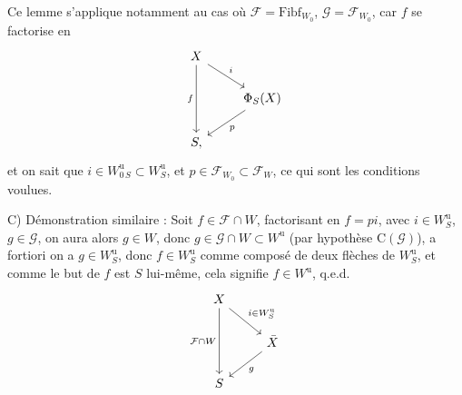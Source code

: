 \documentclass[11pt]{article}
\newcommand{\msp}[1]{\marginpar{\footnotesize [#1]}}
\newcommand{\Fibf}{\mathrm{Fibf}}
\begin{document}
\msp{page 52}
Ce lemme s'applique notamment au cas où $\mathcal{F} = \Fibf_{W_0}$, $\mathcal{G} = \mathcal{F}_{W_0}$, car $f$ se factorise en
\[
\begin{tikzcd}
X \arrow[dr, "i"] \arrow[dd, "f"'] & \\
& \Phi_S(X) \arrow[dl, "p"] \\
S, &
\end{tikzcd}
\]
et on sait que $i \in W^{\mathrm{u}}_{0\,S} \subset W^{\mathrm{u}}_S$, et $p \in \mathcal{F}_{W_0} \subset \mathcal{F}_W$, ce qui sont les conditions voulues.

C) Démonstration similaire : Soit $f \in \mathcal{F} \cap W$, factorisant en $f = pi$, avec $i \in W^{\mathrm{u}}_S$, $g \in \mathcal{G}$, on aura alors $g \in W$, donc $g \in \mathcal{G} \cap W \subset W^{\mathrm{u}}$ (par hypothèse $\mathrm{C}(\mathcal{G})$), a fortiori on a $g \in W^{\mathrm{u}}_S$, donc $f \in W^{\mathrm{u}}_S$ comme composé de deux flèches de $W^{\mathrm{u}}_S$, et comme le but de $f$ est $S$ lui-même, cela signifie $f \in W^{\mathrm{u}}$, q.e.d.
\[
\begin{tikzcd}
X \arrow[dr, "i\in W^{\mathrm{u}}_S"] \arrow[dd, "\mathcal{F}\cap W"'] & \\
& \bar{X} \arrow[dl, "g"] \\
S &
\end{tikzcd}
\]
\end{document}
